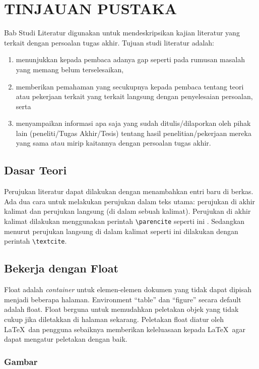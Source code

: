 \chapter{TINJAUAN PUSTAKA}

Bab Studi Literatur digunakan untuk mendeskripsikan kajian literatur yang terkait dengan persoalan tugas akhir. Tujuan studi literatur adalah:

\begin{enumerate}
    \item menunjukkan kepada pembaca adanya gap seperti pada rumusan masalah yang memang belum terselesaikan,
    \item memberikan pemahaman yang secukupnya kepada pembaca tentang teori atau pekerjaan terkait yang terkait langsung dengan penyelesaian persoalan, serta
    \item menyampaikan informasi apa saja yang sudah ditulis/dilaporkan oleh pihak lain (peneliti/Tugas Akhir/Tesis) tentang hasil penelitian/pekerjaan mereka yang sama atau mirip kaitannya dengan persoalan tugas akhir.
\end{enumerate}

\section{Dasar Teori}
Perujukan literatur dapat dilakukan dengan menambahkan entri baru di berkas. Ada dua cara untuk melakukan perujukan dalam teks utama: perujukan di akhir kalimat dan perujukan langsung (di dalam sebuah kalimat). Perujukan di akhir kalimat dilakukan menggunakan perintah \texttt{\textbackslash parencite} seperti ini \parencite{knuth2001art}. Sedangkan menurut \textcite{4026885} perujukan langsung di dalam kalimat seperti ini dilakukan dengan perintah \texttt{\textbackslash textcite}.

\section{Bekerja dengan Float}

Float adalah \textit{container} untuk elemen-elemen dokumen yang tidak dapat dipisah menjadi beberapa halaman. Environment ``table'' dan ``figure'' secara default adalah float. Float berguna untuk memudahkan peletakan objek yang tidak cukup jika diletakkan di halaman sekarang. Peletakan float diatur oleh \LaTeX\ dan pengguna sebaiknya memberikan keleluasaan kepada \LaTeX\ agar dapat mengatur peletakan dengan baik. 

\subsection{Gambar}

